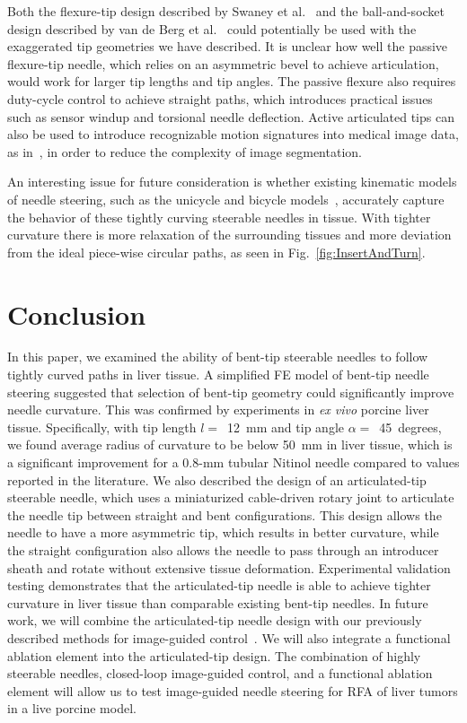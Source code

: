 Both the flexure-tip design described by Swaney et al.~\cite{Swaney2013} and the ball-and-socket design described by van de Berg et al.~\cite{vandeBerg2015} could potentially be used with the exaggerated tip geometries we have described. It is unclear how well the passive flexure-tip needle, which relies on an asymmetric bevel to achieve articulation, would work for larger tip lengths and tip angles. The passive flexure also requires duty-cycle control to achieve straight paths, which introduces practical issues such as sensor windup and torsional needle deflection. Active articulated tips can also be used to introduce recognizable motion signatures into medical image data, as in~\cite{Adebar2014}, in order to reduce the complexity of image segmentation.

An interesting issue for future consideration is whether existing kinematic models of needle steering, such as the unicycle and bicycle models~\cite{Park2005,Webster2006}, accurately capture the behavior of these tightly curving steerable needles in tissue. With tighter curvature there is more relaxation of the surrounding tissues and more deviation from the ideal piece-wise circular paths, as seen in Fig.~\ref{fig:InsertAndTurn}.

\section{Conclusion}
In this paper, we examined the ability of bent-tip steerable needles to follow tightly curved paths in liver tissue. A simplified FE model of bent-tip needle steering suggested that selection of bent-tip geometry could significantly improve needle curvature. This was confirmed by experiments in \textit{ex vivo} porcine liver tissue. Specifically, with tip length $l =$~12~mm and tip angle $\alpha =$~45~degrees, we found average radius of curvature to be below 50~mm in liver tissue, which is a significant improvement for a 0.8-mm tubular Nitinol needle compared to values reported in the literature. We also described the design of an articulated-tip steerable needle, which uses a miniaturized cable-driven rotary joint to articulate the needle tip between straight and bent configurations. This design allows the needle to have a more asymmetric tip, which results in better curvature, while the straight configuration also allows the needle to pass through an introducer sheath and rotate without extensive tissue deformation. Experimental validation testing demonstrates that the articulated-tip needle is able to achieve tighter curvature in liver tissue than comparable existing bent-tip needles. In future work, we will combine the articulated-tip needle design with our previously described methods for image-guided control~\cite{Adebar2014}. We will also integrate a functional ablation element into the articulated-tip design. The combination of highly steerable needles, closed-loop image-guided control, and a functional ablation element will allow us to test image-guided needle steering for RFA of liver tumors in a live porcine model.



